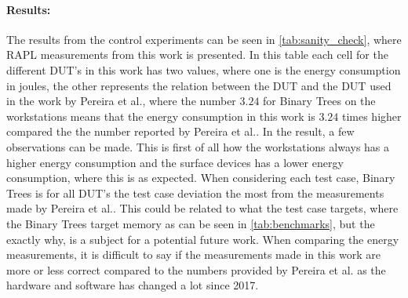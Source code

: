 \paragraph*{Results:} The results from the control experiments can be seen in \cref{tab:sanity_check}, where RAPL measurements from this work is presented. In this table each cell for the different DUT's in this work has two values, where one is the energy consumption in joules, the other represents the relation between the DUT and the DUT used in the work by Pereira et al.\cite*[]{Pereira2017}, where the number $3.24$ for Binary Trees on the workstations means that the energy consumption in this work is $3.24$ times higher compared the the number reported by Pereira et al.\cite*[]{Pereira2017}. In the result, a few observations can be made. This is first of all how the workstations always has a higher energy consumption and the surface devices has a lower energy consumption, where this is as expected. When considering each test case, Binary Trees is for all DUT's the test case deviation the most from the measurements made by Pereira et al.\cite*[]{Pereira2017}. This could be related to what the test case targets, where the Binary Trees target memory as can be seen in \cref*{tab:benchmarks}, but the exactly why, is a subject for a potential future work. When comparing the energy measurements, it is difficult to say if the measurements made in this work are more or less correct compared to the numbers provided by Pereira et al.\cite*[]{Pereira2017} as the hardware and software has changed a lot since 2017.